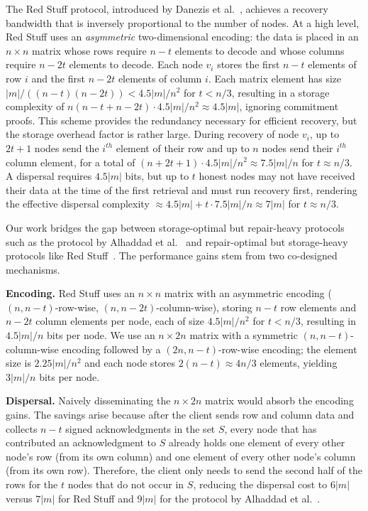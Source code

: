 \documentclass[sigconf,screen]{acmart}
\begin{document}
The Red Stuff protocol, introduced by Danezis et al.~\cite{danezis2025}, achieves a recovery bandwidth that is inversely proportional to the number of nodes. At a high level, Red Stuff uses an \emph{asymmetric} two-dimensional encoding: the data is placed in an $n\times n$ matrix whose rows require $n-t$ elements to decode and whose columns require $n-2t$ elements to decode. Each node $v_i$ stores the first $n-t$ elements of row $i$ and the first $n-2t$ elements of column $i$.
Each matrix element has size $|m|/((n-t)(n-2t)) < 4.5|m|/n^2$ for $t < n/3$, resulting in a storage complexity of $n(n-t+n-2t)\cdot 4.5|m|/n^2 \approx 4.5|m|$, ignoring commitment proofs.
This scheme provides the redundancy necessary for efficient recovery, but the storage overhead factor is rather large.
During recovery of node $v_i$, up to $2t+1$ nodes send the $i^{th}$ element of their row and up to $n$ nodes send their $i^{th}$ column element, for a total of $(n+2t+1)\cdot 4.5|m|/n^2 \approx 7.5|m|/n$ for $t \approx n/3$.
A dispersal requires $4.5|m|$ bits, but up to $t$ honest nodes may not have received their data at the time of the first retrieval and must run recovery first, rendering the effective dispersal complexity $\approx 4.5|m|+ t\cdot7.5|m|/n \approx 7|m|$ for $t\approx n/3$.

Our work bridges the gap between storage-optimal but repair-heavy protocols such as the protocol by Alhaddad et al.~\cite{alhaddad2024} and repair-optimal but storage-heavy protocols like Red Stuff~\cite{danezis2025}.
The performance gains stem from two co-designed mechanisms.

\textbf{Encoding.}
Red Stuff uses an $n\times n$ matrix with an asymmetric encoding ($(n,n-t)$-row-wise, $(n,n-2t)$-column-wise), storing $n-t$ row elements and $n-2t$ column elements per node, each of size $4.5|m|/n^2$ for $t<n/3$, resulting in $4.5|m|/n$ bits per node.
We use an $n\times 2n$ matrix with a symmetric $(n,n-t)$-column-wise encoding followed by a $(2n,n-t)$-row-wise encoding; the element size is $2.25|m|/n^2$ and each node stores $2(n-t)\approx 4n/3$ elements, yielding $3|m|/n$ bits per node.

\textbf{Dispersal.}
Naively disseminating the $n\times 2n$ matrix would absorb the encoding gains.
The savings arise because after the client sends row and column data and collects $n-t$ signed acknowledgments in the set $S$, every node that has contributed an acknowledgment to $S$ already holds one element of every other node's row (from its own column) and one element of every other node's column (from its own row).
Therefore, the client only needs to send the second half of the rows for the $t$ nodes that do not occur in $S$, reducing the dispersal cost to $6|m|$ versus $7|m|$ for Red Stuff and $9|m|$ for the protocol by Alhaddad et al.~\cite{alhaddad2024}.
\end{document}
